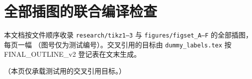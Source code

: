 
\makeatletter
{}
\makeatother

\chapter{全部插图的联合编译检查}
本文档按文件顺序收录 \texttt{research/tikz1--3} 与 \texttt{figures/figset\_A--F} 的全部插图，每页一幅
（图号仅为测试编号）。交叉引用的目标由 \texttt{dummy\_labels.tex} 按 FINAL\_OUTLINE\_v2 登记表在文末生成。
\clearpage









\clearpage

\noindent（本页仅承载测试用的交叉引用目标。）

